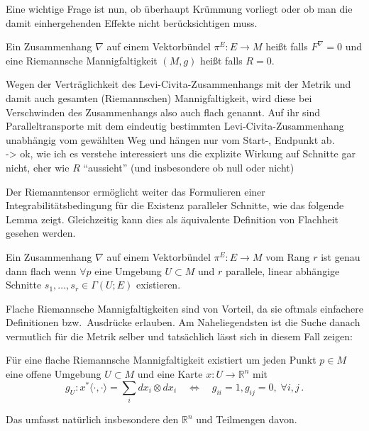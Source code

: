 \documentclass[../H_Analysis_main.tex]{subfiles}
\begin{document}
Eine wichtige Frage ist nun, ob überhaupt Krümmung vorliegt oder ob man die damit einhergehenden Effekte nicht berücksichtigen muss.

\begin{defi}[Flachheit]
Ein Zusammenhang $\nabla$ auf einem Vektorbündel $\pi^E: E \rightarrow M$ heißt  falls $F^\nabla = 0$ und eine Riemannsche Mannigfaltigkeit $(M, g)$ heißt  falls $R = 0$.
\end{defi}

Wegen der Verträglichkeit des Levi-Civita-Zusammenhangs mit der Metrik und damit auch gesamten (Riemannschen) Mannigfaltigkeit, wird diese bei Verschwinden des Zusammenhangs also auch flach genannt. Auf ihr sind Paralleltransporte mit dem eindeutig bestimmten Levi-Civita-Zusammenhang unabhängig vom gewählten Weg und hängen nur vom Start-, Endpunkt ab.\\


-> ok, wie ich es verstehe interessiert uns die explizite Wirkung auf Schnitte gar nicht, eher wie $R$ \enquote{aussieht} (und insbesondere ob null oder nicht)



Der Riemanntensor ermöglicht weiter das Formulieren einer Integrabilitätsbedingung für die Existenz paralleler Schnitte, wie das folgende Lemma zeigt. Gleichzeitig kann dies als äquivalente Definition von Flachheit gesehen werden.
\begin{satz}[Flachheit V2]
Ein Zusammenhang $\nabla$ auf einem Vektorbündel $\pi^E: E \rightarrow M$ vom Rang $r$ ist genau dann flach wenn $\forall p$ eine Umgebung $U \subset M$ und $r$ parallele, linear abhängige Schnitte $s_1, \dots, s_r \in \Gamma(U; E)$ existieren.
\end{satz}

Flache Riemannsche Mannigfaltigkeiten sind von Vorteil, da sie oftmals einfachere Definitionen bzw.~Ausdrücke erlauben. Am Naheliegendsten ist die Suche danach vermutlich für die Metrik selber und tatsächlich lässt sich in diesem Fall zeigen:

\begin{cor}
Für eine flache Riemannsche Mannigfaltigkeit existiert um jeden Punkt $p \in M$ eine offene Umgebung $U \subset M$ und eine Karte $x: U \rightarrow \mathbb{R}^n$ mit
\begin{equation}
g_U: x^* \langle \cdot, \cdot \rangle = \sum_i dx_i \otimes dx_i \quad \Leftrightarrow \quad g_{ii} = 1, g_{ij} = 0, \; \forall i, j \, .
\end{equation}
\end{cor}
Das umfasst natürlich insbesondere den $\mathbb{R}^n$ und Teilmengen davon.
\end{document}
